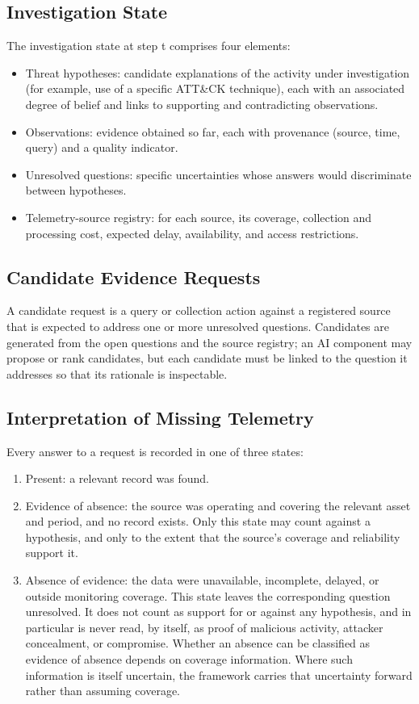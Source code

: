 \documentclass[a4paper,11pt,oneside]{article}
\begin{document}
\subsection{Investigation State}
The investigation state at step t comprises four elements:
\begin{itemize}[leftmargin=*, itemsep=2pt, topsep=3pt]
\item Threat hypotheses: candidate explanations of the activity under investigation
(for example, use of a specific ATT\&CK technique), each with an associated degree of belief and links to supporting and contradicting observations.
\item Observations: evidence obtained so far, each with provenance (source, time, query)
and a quality indicator.
\item Unresolved questions: specific uncertainties whose answers would discriminate
between hypotheses.
\item Telemetry-source registry: for each source, its coverage, collection and processing
cost, expected delay, availability, and access restrictions.
\end{itemize}
\subsection{Candidate Evidence Requests}
A candidate request is a query or collection action against a registered source that is expected to address one or more unresolved questions. Candidates are generated from the open questions and the source registry; an AI component may propose or rank candidates, but each candidate must be linked to the question it addresses so that its rationale is inspectable.
\subsection{Interpretation of Missing Telemetry}
Every answer to a request is recorded in one of three states:
\begin{enumerate}[leftmargin=*, itemsep=2pt, topsep=3pt]
\item Present: a relevant record was found.
\item Evidence of absence: the source was operating and covering the relevant asset
and period, and no record exists. Only this state may count against a hypothesis, and only to the extent that the source’s coverage and reliability support it.
\item Absence of evidence: the data were unavailable, incomplete, delayed, or outside
monitoring coverage. This state leaves the corresponding question unresolved. It does not count as support for or against any hypothesis, and in particular is never read, by itself, as proof of malicious activity, attacker concealment, or compromise. Whether an absence can be classified as evidence of absence depends on coverage information. Where such information is itself uncertain, the framework carries that uncertainty forward rather than assuming coverage.
\end{enumerate}
\end{document}
